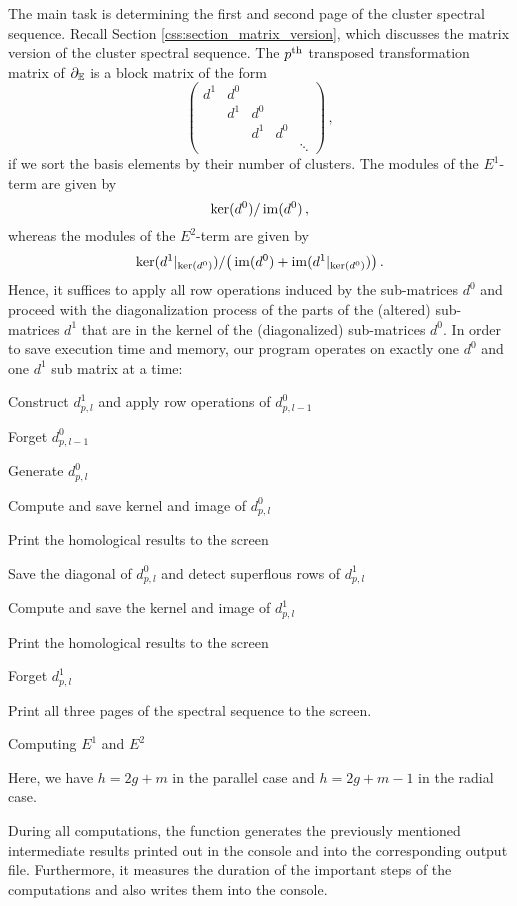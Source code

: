 The main task is determining the first and second page of the cluster spectral sequence.
Recall Section \ref{css:section_matrix_version}, which discusses the matrix version of the cluster spectral sequence.
The $p^{\text{th}}$ transposed transformation matrix of $\partial_\mathbb E$ is a block matrix of the form
\[ 
    \begin{pmatrix}
        d^1 & d^0 \\
            & d^1   & d^0 \\
            &       & d^1   & d^0 \\
            &       &       &       & \ddots
    \end{pmatrix} \,,
\]
if we sort the basis elements by their number of clusters.
The modules of the $E^1$-term are given by
\[
    \ker(d^0) / \operatorname{im}(d^0)\,,
\]
whereas the modules of the $E^2$-term are given by
\[
    \ker(d^1|_{\ker(d^0)}) / \big( \operatorname{im}(d^0) + \operatorname{im}(d^1|_{\ker(d^0)}) \big) \,.
\]
Hence, it suffices to apply all row operations induced by the sub-matrices $d^0$ and proceed with the diagonalization process of
the parts of the (altered) sub-matrices $d^1$ that are in the kernel of the (diagonalized) sub-matrices $d^0$.
In order to save execution time and memory, our program operates on exactly one $d^0$ and one $d^1$ sub matrix at a time:

\begin{algorithm}[H]
\DontPrintSemicolon
{}
{
    {
        Construct $d^1_{p,l}$ and apply row operations of $d^0_{p,l-1}$
        
        Forget $d^0_{p,l-1}$
        
        Generate $d^0_{p,l}$
        
        Compute and save kernel and image of $d^0_{p,l}$
        
        Print the homological results to the screen
        
        Save the diagonal of $d^0_{p,l}$ and detect superflous rows of $d^1_{p,l}$
        
        Compute and save the kernel and image of $d^1_{p,l}$
        
        Print the homological results to the screen
        
        Forget $d^1_{p,l}$
    }
}
Print all three pages of the spectral sequence to the screen.
\caption{Computing $E^1$ and $E^2$}
\end{algorithm}

Here, we have $h = 2g + m$ in the parallel case and $h = 2g + m - 1$ in the radial case.

During all computations, the function  generates the previously mentioned intermediate results 
printed out in the console and into the corresponding output file.
Furthermore, it measures the duration of the important steps of the computations 
and also writes them into the console. 